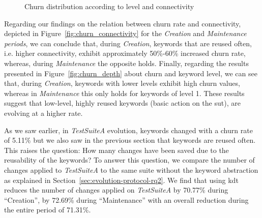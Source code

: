 \begin{figure}
\centering
{}
\caption{Churn distribution according to level and connectivity}  
\label{fig:churn:analysis}
\end{figure}

Regarding our findings on the relation between churn rate and connectivity, depicted in Figure~\ref{fig:churn_connectivity} for the \emph{Creation} and \emph{Maintenance periods}, we can conclude that, during \emph{Creation}, keywords that are reused often, i.e. higher connectivity, exhibit approximately 50\%-60\% increased churn rate, whereas, during \emph{Maintenance} the opposite holds. Finally, regarding the results presented in Figure~\ref{fig:churn_depth} about churn and keyword level, we can see that, during \emph{Creation}, keywords with lower levels exhibit high churn values, whereas in \emph{Maintenance} this only holds for keywords of level 1. These results suggest that low-level, highly reused keywords (basic action on the \gls{sut}), are evolving at a higher rate.

As we saw earlier, in \emph{TestSuiteA} evolution, keywords changed with a churn rate of 5.11\% but we also saw in the previous section that keywords are reused often. This raises the question: How many changes have been saved due to the reusability of the keywords? To answer this question, we compare the number of changes applied to \emph{TestSuiteA} to the same suite without the keyword abstraction as explained in Section~\ref{sec:evolution-protocol-rq2}. We find that using \gls{kdt} reduces the number of changes applied on \emph{TestSuiteA} by 70.77\% during ``Creation'', by 72.69\% during ``Maintenance'' with an overall reduction during the entire period of 71.31\%. 

